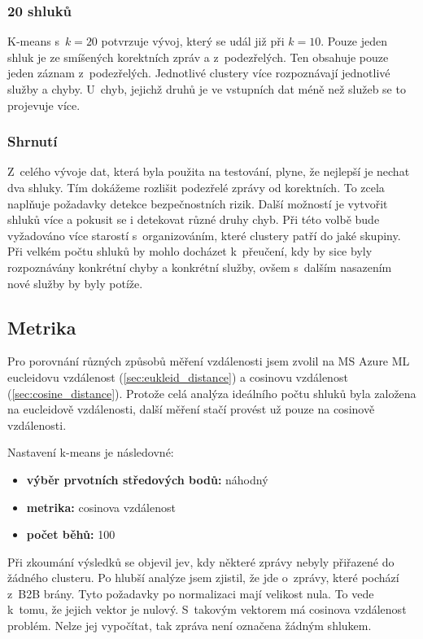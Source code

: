 \documentclass[thesis=M,czech]{FITthesis}[2012/10/20]
\begin{document}
				\subsubsection{20 shluků}
				K-means s~$k = 20$ potvrzuje vývoj, který se udál již při $k = 10$. Pouze jeden shluk je ze smíšených korektních zpráv a z~podezřelých. Ten obsahuje pouze jeden záznam z~podezřelých. Jednotlivé clustery více rozpoznávají jednotlivé služby a chyby. U~chyb, jejichž druhů je ve vstupních dat méně než služeb se to projevuje více.
				
				\subsubsection{Shrnutí}
					Z~celého vývoje dat, která byla použita na testování, plyne, že nejlepší je nechat dva shluky. Tím dokážeme rozlišit podezřelé zprávy od korektních. To zcela naplňuje požadavky detekce bezpečnostních rizik. Další možností je vytvořit shluků více a pokusit se i detekovat různé druhy chyb. Při této volbě bude vyžadováno více starostí s~organizováním, které clustery patří do jaké skupiny. Při velkém počtu shluků by mohlo docházet k~přeučení, kdy by sice byly rozpoznávány konkrétní chyby a konkrétní služby, ovšem s~dalším nasazením nové služby by byly potíže.
		
		\subsection{Metrika}
			Pro porovnání různých způsobů měření vzdálenosti jsem zvolil na MS Azure ML eucleidovu vzdálenost (\ref{sec:eukleid_distance}) a cosinovu vzdálenost (\ref{sec:cosine_distance}). Protože celá analýza ideálního počtu shluků byla založena na eucleidově vzdálenosti, další měření stačí provést už pouze na cosinově vzdálenosti.
			
			Nastavení k-means je následovné:
			\begin{itemize} 
				\item \textbf{výběr prvotních středových bodů: } náhodný
				\item \textbf{metrika: } cosinova vzdálenost
				\item \textbf{počet běhů: } 100		
			\end{itemize}
		
			Při zkoumání výsledků se objevil jev, kdy některé zprávy nebyly přiřazené do žádného clusteru. Po hlubší analýze jsem zjistil, že jde o~zprávy, které pochází z~B2B brány. Tyto požadavky po normalizaci mají velikost nula. To vede k~tomu, že jejich vektor je nulový. S~takovým vektorem má cosinova vzdálenost problém. Nelze jej vypočítat, tak zpráva není označena žádným shlukem.
			
\end{document}

